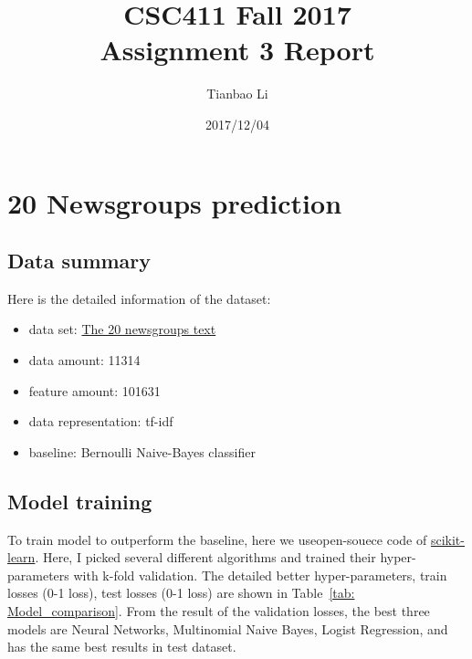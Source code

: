 \documentclass[a4paper]{article}
\title{CSC411 Fall 2017\\Assignment 3 Report}
\author{Tianbao Li}
\date{2017/12/04}
\begin{document}
\maketitle

\section{20 Newsgroups prediction}

\subsection{Data summary}

Here is the detailed information of the dataset:

\begin{itemize}
    \item data set: \href{http://scikit-learn.org/stable/datasets/twenty_newsgroups.html}{The 20 newsgroups text}
    \item data amount: 11314
    \item feature amount: 101631
    \item data representation: tf-idf
    \item baseline: Bernoulli Naive-Bayes classifier
\end{itemize}

\subsection{Model training}

To train model to outperform the baseline, here we useopen-souece code of \href{http://scikit-learn.org/stable/}{scikit-learn}. Here, I picked several different algorithms and trained their hyper-parameters with k-fold validation. The detailed better hyper-parameters, train losses (0-1 loss), test losses (0-1 loss) are shown in Table~\ref{tab: Model_comparison}. From the result of the validation losses, the best three models are Neural Networks, Multinomial Naive Bayes, Logist Regression, and has the same best results in test dataset.
\end{document}
